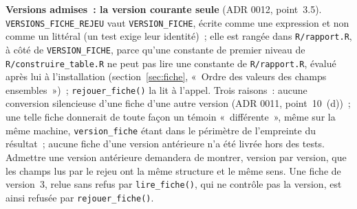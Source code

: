 \documentclass[a4paper,11pt]{article}
\newcommand{\code}[1]{\texttt{\small #1}}
\begin{document}
\noindent
\textbf{Versions admises~: la version courante seule} (ADR 0012, point~3.5).
\code{VERSIONS\_FICHE\_REJEU} vaut \code{VERSION\_FICHE}, écrite comme une
expression et non comme un littéral (un test exige leur identité)~; elle est
rangée dans \code{R/rapport.R}, à côté de \code{VERSION\_FICHE}, parce
qu'une constante de premier niveau de \code{R/construire\_table.R} ne peut
pas lire une constante de \code{R/rapport.R}, évalué après lui à
l'installation (section~\ref{sec:fiche}, «~Ordre des valeurs des champs
ensembles~»)~; \code{rejouer\_fiche()} la lit à l'appel. Trois raisons~:
aucune conversion silencieuse d'une fiche d'une autre version (ADR 0011,
point~10~(d))~; une telle fiche donnerait de toute façon un témoin
«~différente~», même sur la même machine, \code{version\_fiche} étant dans le
périmètre de l'empreinte du résultat~; aucune fiche d'une version antérieure
n'a été livrée hors des tests. Admettre une version antérieure demandera de
montrer, version par version, que les champs lus par le rejeu ont la même
structure et le même sens. Une fiche de version~3, relue sans refus par
\code{lire\_fiche()}, qui ne contrôle pas la version, est ainsi refusée par
\code{rejouer\_fiche()}.
\end{document}
